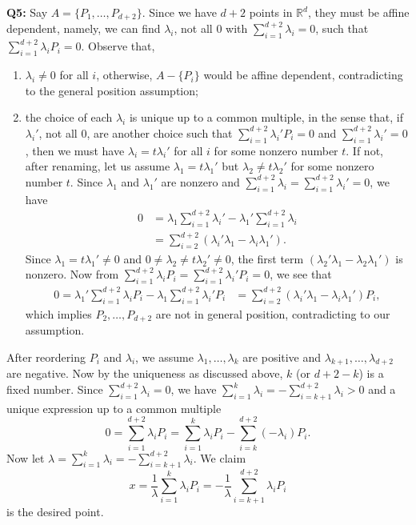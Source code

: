 \documentclass[12pt,reqno]{amsart}
\theoremstyle{definition}
\newcommand{\RR}{\mathbb{R}}
\begin{document}
\newpage
\noindent \textbf{Q5:} Say $A=\{P_1,\dots,P_{d+2}\}$. Since we have $d+2$ points in $\RR^d$, they must be affine dependent, namely, we can find $\lambda_i$, not all 0 with $\sum_{i=1}^{d+2}\lambda_i=0$, such that $\sum_{i=1}^{d+2}\lambda_i P_i=0$. Observe that,
\begin{enumerate}
  \item $\lambda_i\not=0$ for all $i$, otherwise, $A-\{P_i\}$ would be affine dependent, contradicting to the general position assumption;
  \item the choice of each $\lambda_i$ is unique up to a common multiple, in the sense that, if $\lambda_i'$, not all 0, are another choice such that $\sum_{i=1}^{d+2}\lambda_i'P_i=0$ and $\sum_{i=1}^{d+2} \lambda_i'=0$, then we must have $\lambda_i =t\lambda_i'$ for all $i$ for some nonzero number $t$. If not, after renaming, let us assume $\lambda_1 = t\lambda_1'$ but $\lambda_2\not= t\lambda_2'$ for some nonzero number $t$. Since $\lambda_1$ and $\lambda_1'$ are nonzero and   $\sum_{i=1}^{d+2} \lambda_i =\sum_{i=1}^{d+2} \lambda_i'=0$, we have \begin{align*}
          0 & = \lambda_1\sum_{i=1}^{d+2} \lambda_i' - \lambda_1' \sum_{i=1}^{d+2} \lambda_i \\
            & = \sum_{i=2}^{d+2} (\lambda_i' \lambda_1-\lambda_i\lambda_1').
        \end{align*}
        Since $\lambda_1 = t\lambda_1'\not=0$ and $0\not=\lambda_2\not= t\lambda_2'\not=0$, the first term $(\lambda_2' \lambda_1-\lambda_2\lambda_1')$ is nonzero. Now from $\sum_{i=1}^{d+2}\lambda_i P_i=\sum_{i=1}^{d+2}\lambda_i'P_i=0$, we see that \begin{align*}
          0= \lambda_1'\sum_{i=1}^{d+2}\lambda_i P_i - \lambda_1\sum_{i=1}^{d+2}\lambda_i'P_i & =  \sum_{i=2}^{d+2} (\lambda_i' \lambda_1-\lambda_i\lambda_1') P_i,
        \end{align*}
        which implies $P_2,\dots,P_{d+2}$ are not in general position, contradicting to our assumption.
\end{enumerate}
After reordering $P_i$ and $\lambda_i$, we assume $\lambda_1,\dots,\lambda_k$ are positive and $\lambda_{k+1},\dots,\lambda_{d+2}$ are negative. Now by the uniqueness as discussed above, $k$ (or $d+2-k$) is a fixed number. Since $\sum_{i=1}^{d+2}\lambda_i=0$, we have $\sum_{i=1}^{k}\lambda_i = -\sum_{i=k+1}^{d+2}\lambda_i>0$ and a unique expression up to a common multiple $$0 = \sum_{i=1}^{d+2}\lambda_i P_i  = \sum_{i=1}^{k}\lambda_i P_i  - \sum_{i=k}^{d+2}(-\lambda_i)P_i.$$ Now let $\lambda = \sum_{i=1}^{k}\lambda_i = -\sum_{i=k+1}^{d+2}\lambda_i.$ We claim $$x=\frac{1}{\lambda}\sum_{i=1}^{k}\lambda_i P_i = -\frac{1}{\lambda}\sum_{i=k+1}^{d+2}\lambda_i P_i$$
is the desired point.
\end{document}
